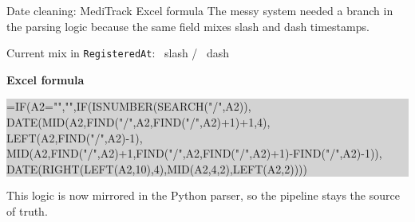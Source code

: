 \documentclass[aspectratio=169,12pt]{beamer}
\begin{document}
\begin{frame}{Date cleaning: MediTrack Excel formula}
\small
The messy system needed a branch in the parsing logic because the same field mixes slash and dash timestamps.

\vspace{0.3em}
{\scriptsize\color{midgray}Current mix in \texttt{RegisteredAt}: \MediFlowMediTrackSlashPct\ slash / \MediFlowMediTrackDashPct\ dash}

\vspace{0.55em}
\textbf{Excel formula}

\vspace{0.15em}
\colorbox{lightgray}{\parbox{\dimexpr\textwidth-2em\relax}{\scriptsize\ttfamily
=IF(A2="","",IF(ISNUMBER(SEARCH("/",A2)),\\
\hspace*{1.5em}DATE(MID(A2,FIND("/",A2,FIND("/",A2)+1)+1,4),\\
\hspace*{3.0em}LEFT(A2,FIND("/",A2)-1),\\
\hspace*{3.0em}MID(A2,FIND("/",A2)+1,FIND("/",A2,FIND("/",A2)+1)-FIND("/",A2)-1)),\\
\hspace*{1.5em}DATE(RIGHT(LEFT(A2,10),4),MID(A2,4,2),LEFT(A2,2))))}}

\vspace{0.6em}
{\scriptsize\color{midgray}This logic is now mirrored in the Python parser, so the pipeline stays the source of truth.}
\end{frame}
\end{document}
